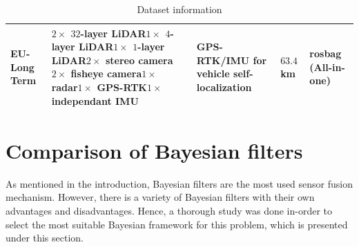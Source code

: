 \begin{table}[htp]
\begin{tabular}{ |p{}|p{}|p{}|p{}|p{}|  }
	\hline
	EU-Long Term & $2\times$ $32$-layer LiDAR\newline $1\times$ $4$-layer LiDAR\newline $1\times$ $1$-layer LiDAR\newline $2\times$ stereo camera \newline $2\times$ fisheye camera\newline $1\times$ radar\newline $1\times$ GPS-RTK\newline $1\times$ independant IMU\newline & GPS-RTK/IMU for vehicle self-localization & $63.4$ km & rosbag (All-in-one)\\
	\hline
\end{tabular}
\caption{Dataset information}
\label{table:pa:Datasets}
\vspace{0.5cm}
\end{table}








\section{Comparison of Bayesian filters}
As mentioned in the introduction, Bayesian filters are the most used sensor fusion mechanism. However, there is a variety of Bayesian filters with their own advantages and disadvantages. Hence, a thorough study was done in-order to select the most suitable Bayesian framework for this problem, which is presented under this section.


